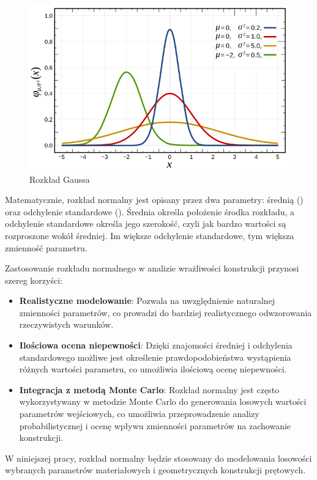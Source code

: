 \begin{figure}[H]
    \centering
    \includegraphics[scale=0.6]{images/Gauss}
    \caption{Rozkład Gaussa\cite{gauss}}
\end{figure}

Matematycznie, rozkład normalny jest opisany przez dwa parametry: średnią (\mu) oraz odchylenie standardowe (\sigma).
Średnia określa położenie środka rozkładu, a odchylenie standardowe określa jego szerokość, czyli jak bardzo wartości są rozproszone wokół średniej.
Im większe odchylenie standardowe, tym większa zmienność parametru\cite{gauss}.

Zastosowanie rozkładu normalnego w analizie wrażliwości konstrukcji przynosi szereg korzyści:

\begin{itemize}
    \item \textbf{Realistyczne modelowanie}: Pozwala na uwzględnienie naturalnej zmienności parametrów, co prowadzi do bardziej realistycznego odwzorowania rzeczywistych warunków.
    \item \textbf{Ilościowa ocena niepewności}: Dzięki znajomości średniej i odchylenia standardowego możliwe jest określenie prawdopodobieństwa wystąpienia różnych wartości parametru, co umożliwia ilościową ocenę niepewności.
    \item \textbf{Integracja z metodą Monte Carlo}: Rozkład normalny jest często wykorzystywany w metodzie Monte Carlo do generowania losowych wartości parametrów wejściowych, co umożliwia przeprowadzenie analizy probabilistycznej i ocenę wpływu zmienności parametrów na zachowanie konstrukcji.
\end{itemize}
W niniejszej pracy, rozkład normalny będzie stosowany do modelowania losowości wybranych parametrów materiałowych i geometrycznych konstrukcji prętowych.

